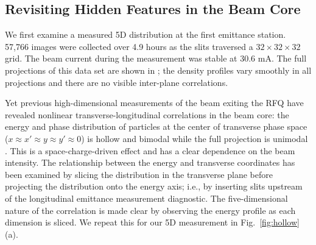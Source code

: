 \documentclass[letterpaper,
               nospread,
               biblatex,
              ]{jacow}
\begin{document}
\subsection{Revisiting Hidden Features in the Beam Core}

We first examine a measured 5D distribution at the first emittance station. 57,766 images were collected over 4.9 hours as the slits traversed a $32 \times 32 \times 32$ grid. The beam current during the measurement was stable at 30.6 mA. The full projections of this data set are shown in \cite{Ruisard2022-NAPAC}; the density profiles vary smoothly in all projections and there are no visible inter-plane correlations.

Yet previous high-dimensional measurements of the beam exiting the RFQ have revealed nonlinear transverse-longitudinal correlations in the beam core: the energy and phase distribution of particles at the center of transverse phase space ($x \approx x' \approx y \approx y' \approx 0$) is hollow and bimodal while the full projection is unimodal \cite{Cathey2018}. This is a space-charge-driven effect \cite{Ruisard2021-hollow} and has a clear dependence on the beam intensity. The relationship between the energy and transverse coordinates has been examined by slicing the distribution in the transverse plane before projecting the distribution onto the energy axis; i.e., by inserting slits upstream of the longitudinal emittance measurement diagnostic. The five-dimensional nature of the correlation is made clear by observing the energy profile as each dimension is sliced. We repeat this for our 5D measurement in Fig.~\ref{fig:hollow}(a).
%
\end{document}
